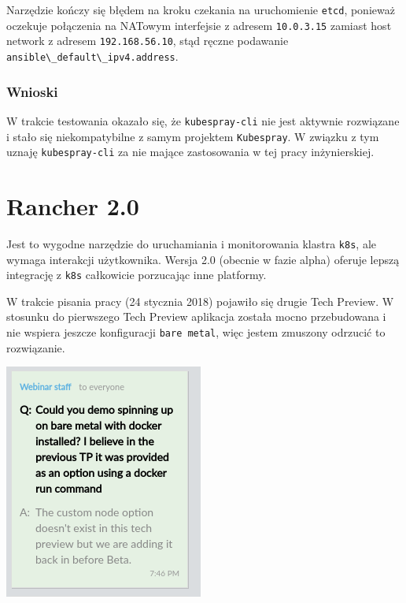 \documentclass[a4paper,12pt,twoside,openany]{report}
\newcommand{\passthrough}[1]{#1}
\begin{document}
Narzędzie kończy się błędem na kroku czekania na uruchomienie
\passthrough{\lstinline!etcd!}, ponieważ oczekuje połączenia na NATowym
interfejsie z adresem \passthrough{\lstinline!10.0.3.15!} zamiast host
network z adresem \passthrough{\lstinline!192.168.56.10!}, stąd ręczne
podawanie \passthrough{\lstinline!ansible\_default\_ipv4.address!}.

\hypertarget{wnioski-1}{%
\subsubsection{Wnioski}\label{wnioski-1}}

W trakcie testowania okazało się, że
\passthrough{\lstinline!kubespray-cli!} nie jest aktywnie rozwiązane i
stało się niekompatybilne z samym projektem
\passthrough{\lstinline!Kubespray!}. W związku z tym uznaję
\passthrough{\lstinline!kubespray-cli!} za nie mające zastosowania w tej
pracy inżynierskiej.

\hypertarget{rancher-kubernetes}{%
\section{Rancher 2.0}\label{rancher-kubernetes}}

Jest to wygodne narzędzie do uruchamiania i monitorowania klastra
\passthrough{\lstinline!k8s!}, ale wymaga interakcji użytkownika. Wersja
2.0 (obecnie w fazie alpha) oferuje lepszą integrację z
\passthrough{\lstinline!k8s!} całkowicie porzucając inne platformy.

W trakcie pisania pracy (24 stycznia 2018) pojawiło się drugie Tech
Preview. W stosunku do pierwszego Tech Preview aplikacja została mocno
przebudowana i nie wspiera jeszcze konfiguracji
\passthrough{\lstinline!bare metal!}, więc jestem zmuszony odrzucić to
rozwiązanie.

\includegraphics{assets/rancher-tp2-baremetal.png}\\
\end{document}
